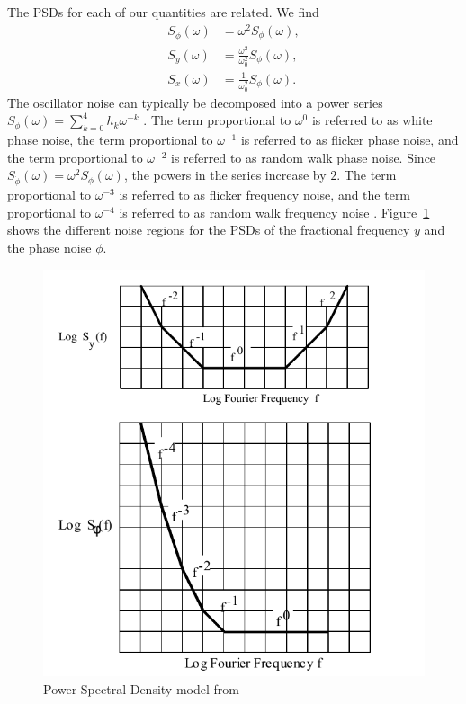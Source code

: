 The PSDs for each of our quantities are related. We find
%
\begin{subequations}
\begin{align}
S_{\dot{\phi}}(\omega) &= \omega^2 S_\phi(\omega), \\
S_y(\omega) &= \frac{\omega^2}{\omega_0^2}S_\phi(\omega), \\
S_x(\omega) &= \frac{1}{\omega_0^2}S_\phi(\omega).
\end{align}
\end{subequations}
%
The oscillator noise can typically be decomposed into a power series $S_\phi(\omega) = \sum_{k=0}^{4} h_k\omega^{-k}$ \cite{Riley1994}. The term proportional to $\omega^0$ is referred to as white phase noise, the term proportional to $\omega^{-1}$ is referred to as flicker phase noise, and the term proportional to $\omega^{-2}$ is referred to as random walk phase noise. Since $S_{\dot{\phi}}(\omega) = \omega^2 S_\phi(\omega)$, the powers in the series increase by $2$. The term proportional to $\omega^{-3}$ is referred to as flicker frequency noise, and the term proportional to $\omega^{-4}$ is referred to as random walk frequency noise \cite{Kartaschoff1978, LohWhite, LohFlicker, NISTFreqStandards}. Figure~\ref{fig:PSD} shows the different noise regions for the PSDs of the fractional frequency $y$ and the phase noise $\phi$.
%
\begin{figure}[htp]
	\centering
	\includegraphics[scale=0.9]{img/PSD.pdf}
	\caption{Power Spectral Density model from \cite{PSDFigure}} \label{fig:PSD}
\end{figure}

